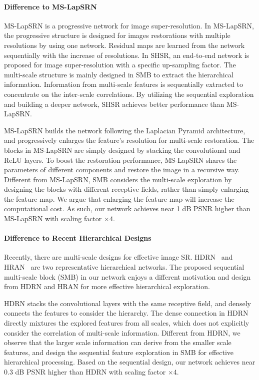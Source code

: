 \documentclass[manuscript,screen]{acmart}
\begin{document}
\paragraph{Difference to MS-LapSRN~\cite{lapsrn_pami2019}}
MS-LapSRN is a progressive network for image super-resolution. In MS-LapSRN, the progressive structure is designed for images restorations with multiple resolutions by using one network. Residual maps are learned from the network sequentially with the increase of resolutions. In SHSR, an end-to-end network is proposed for image super-resolution with a specific up-sampling factor. The multi-scale structure is mainly designed in SMB to extract the hierarchical information. Information from multi-scale features is sequentially extracted to concentrate on the inter-scale correlations. By utilizing the sequential exploration and building a deeper network, SHSR achieves better performance than MS-LapSRN.

MS-LapSRN builds the network following the Laplacian Pyramid architecture, and progressively enlarges the feature’s resolution for multi-scale restoration. The blocks in MS-LapSRN are simply designed by stacking the convolutional and ReLU layers. To boost the restoration performance, MS-LapSRN shares the parameters of different components and restore the image in a recursive way. Different from MS-LapSRN, SMB considers the multi-scale exploration by designing the blocks with different receptive fields, rather than simply enlarging the feature map. We argue that enlarging the feature map will increase the computational cost. As such, our network achieves near 1 dB PSNR higher than MS-LapSRN with scaling factor $\times4$.


\paragraph{Difference to Recent Hierarchical Designs}
Recently, there are multi-scale designs for effective image SR. HDRN~\cite{hdrn} and HRAN~\cite{hran} are two representative hierarchical networks. The proposed sequential multi-scale block (SMB) in our network enjoys a different motivation and design from HDRN and HRAN for more effective hierarchical exploration.

HDRN stacks the convolutional layers with the same receptive field, and densely connects the features to consider the hierarchy. The dense connection in HDRN directly mixtures the explored features from all scales, which does not explicitly consider the correlation of multi-scale information. Different from HDRN, we observe that the larger scale information can derive from the smaller scale features, and design the sequential feature exploration in SMB for effective hierarchical processing. Based on the sequential design, our network achieves near 0.3 dB PSNR higher than HDRN with scaling factor $\times4$.
\end{document}
